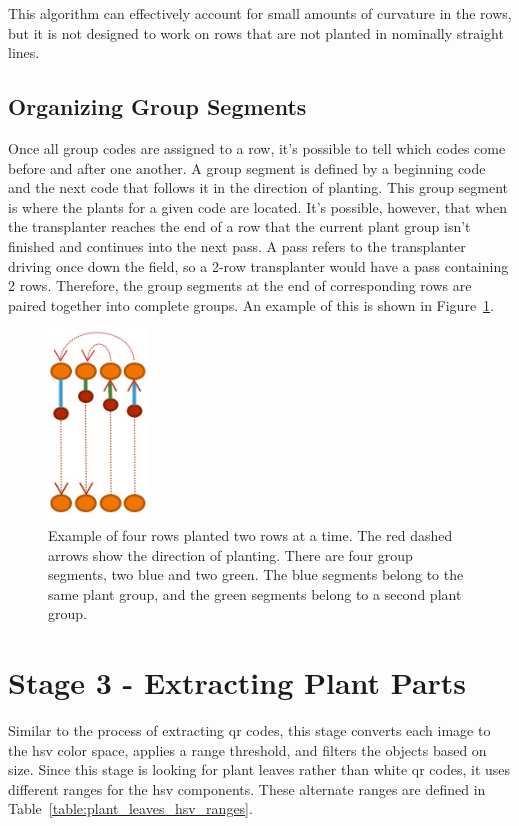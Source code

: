 This algorithm can effectively account for small amounts of curvature in the rows, but it is not designed to work on rows that are not planted in nominally straight lines.

\subsection{Organizing Group Segments}

Once all group codes are assigned to a row, it's possible to tell which codes come before and after one another.  A group segment is defined by a beginning code and the next code that follows it in the direction of planting.  This group segment is where the plants for a given code are located.  It's possible, however, that when the transplanter reaches the end of a row that the current plant group isn't finished and continues into the next pass.  A pass refers to the transplanter driving once down the field, so a 2-row transplanter would have a pass containing 2 rows.  Therefore, the group segments at the end of corresponding rows are paired together into complete groups.  An example of this is shown in Figure~\ref{figure:group_segments}.

\begin{figure}
	\centering
    \includegraphics[height=2in]{figures/group_segments.jpg}
    \caption[Group segments]{Example of four rows planted two rows at a time.  The red dashed arrows show the direction of planting.  There are four group segments, two blue and two green.  The blue segments belong to the same plant group, and the green segments belong to a second plant group.}
    \label{figure:group_segments}
\end{figure}

\section{Stage 3 - Extracting Plant Parts}
\label{processing-stage3}

Similar to the process of extracting \ac{qr} codes, this stage converts each image to the \ac{hsv} color space, applies a range threshold, and filters the objects based on size.  Since this stage is looking for plant leaves rather than white \ac{qr} codes, it uses different ranges for the \ac{hsv} components.  These alternate ranges are defined in Table~\ref{table:plant_leaves_hsv_ranges}.

